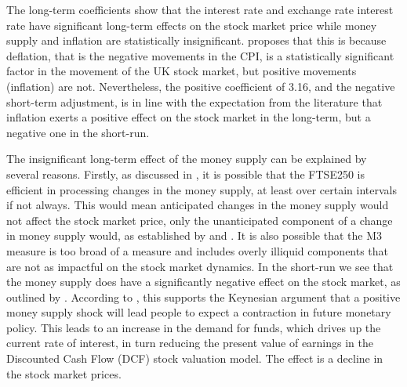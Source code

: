 \documentclass[11pt,a4paper]{article}
\newcommand{\citeboth}[1]{\citeauthor{#1} \citep{#1}}
\begin{document}
The long-term coefficients show that the interest rate and exchange rate
interest rate have significant long-term effects on the stock market price
while money supply and inflation are statistically insignificant. \citeboth{neifar2023}
proposes that this is because deflation, that is the negative movements in the 
CPI, is a statistically significant factor in the movement of the UK stock 
market, but positive movements (inflation) are not. Nevertheless, the positive
coefficient of 3.16, and the negative short-term adjustment, is in line with the expectation from the literature that 
inflation exerts a positive effect on the stock market in the long-term, but a negative 
one in the short-run. 

The insignificant long-term effect of the money supply can be explained by several reasons.
Firstly, as discussed in \citeboth{sellin2001}, it is possible that the FTSE250 is efficient in processing changes in the 
money supply, at least over certain intervals if not always. This would mean anticipated changes in the money supply would not affect the stock market price, only the
unanticipated component of a change in money supply would, as established by \citeboth{sorensen1982} and \citeboth{bernanke2005}. 
It is also possible that the M3 measure is too broad of a measure and includes overly illiquid components that are not as impactful 
on the stock market dynamics. In the short-run we see that the money supply does have a 
significantly negative effect on the stock market, as outlined by \citeboth{olawale2014}. According to \citeboth{sellin2001}, 
this supports the Keynesian argument that a positive money supply shock will lead people to
expect a contraction in future monetary policy. 
This leads to an increase in the demand for funds, which drives up the current rate of interest, in turn
reducing the present value of earnings in the Discounted Cash Flow (DCF) stock valuation model. The effect is a decline in the stock market prices.
\end{document}
